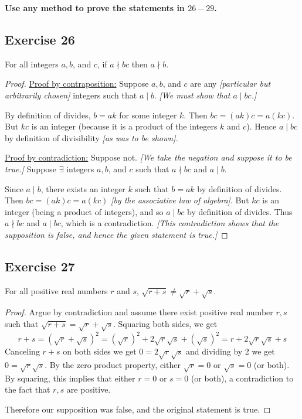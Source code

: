 \documentclass[14pt]{extarticle}
\newcommand{\te}{\exists}
\newcommand{\cy}{\color{cyan}}
\begin{document}
{\bf \cy Use any method to prove the statements in $26-29$.}

\subsection{Exercise 26}
For all integers $a, b$, and $c$, if $a \nmid bc$ then $a \nmid b$.

\begin{proof}
    \underline{Proof by contraposition:} Suppose $a, b$, and $c$ are any {\it [particular but arbitrarily chosen]} integers such that $a \mid b$. {\it [We must show that $a \mid bc$.]}

    By definition of divides, $b = ak$ for some integer $k$. Then $bc = (ak)c = a(kc)$. But $kc$ is an integer (because it is a product of the integers $k$ and $c$). Hence $a \mid bc$ by definition of divisibility {\it [as was to be shown].}

    \underline{Proof by contradiction:} Suppose not. {\it [We take the negation and suppose it to be true.]} Suppose $\te$ integers $a, b$, and $c$ such that $a \nmid bc$ and $a \mid b$.

    Since $a \mid b$, there exists an integer $k$ such that $b = ak$ by definition of divides. Then $bc = (ak)c = a(kc)$ {\it [by the associative law of algebra]}. But $kc$ is an integer (being a product of integers), and so $a \mid bc$ by definition of divides. Thus $a \nmid bc$ and $a \mid bc$, which is a contradiction. {\it [This contradiction shows that the supposition is false, and hence the given statement is true.]}
\end{proof}

\subsection{Exercise 27}
For all positive real numbers $r$ and $s$, $\sqrt{r+s} \neq \sqrt{r}+\sqrt{s}$.

\begin{proof}
    Argue by contradiction and assume there exist positive real number $r,s$ such that $\sqrt{r+s} = \sqrt{r}+\sqrt{s}$. Squaring both sides, we get
    \[
        r+s = (\sqrt{r}+\sqrt{s})^2 = (\sqrt{r})^2 + 2\sqrt{r}\sqrt{s} + (\sqrt{s})^2 = r + 2\sqrt{r}\sqrt{s} + s
    \]
    Canceling $r+s$ on both sides we get $0 = 2\sqrt{r}\sqrt{s}$ and dividing by 2 we get $0 = \sqrt{r}\sqrt{s}$. By the zero product property, either $\sqrt{r} = 0$ or $\sqrt{s} = 0$ (or both). By squaring, this implies that either $r = 0$ or $s = 0$ (or both), a contradiction to the fact that $r,s$ are positive.

    Therefore our supposition was false, and the original statement is true.
\end{proof}
\end{document}
